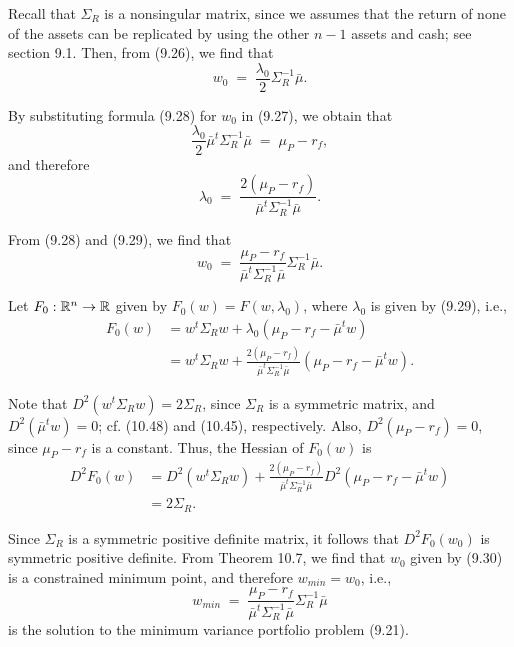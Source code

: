 
Recall that $\Sigma_R$ is a nonsingular matrix, since we assumes that the return of
none of the assets can be replicated by using the other $n-1$ assets and cash; see
section 9.1. Then, from (9.26), we find that
\begin{equation}
w_0 \;=\; \frac{\lambda_0}{2}\Sigma_R^{-1}\bar\mu.
\end{equation}

By substituting formula (9.28) for $w_0$ in (9.27), we obtain that
\[
\frac{\lambda_0}{2}\bar\mu^t\Sigma_R^{-1}\bar\mu \;=\; \mu_P-r_f,
\]
and therefore
\begin{equation}
\lambda_0 \;=\; \frac{2(\mu_P-r_f)}{\bar\mu^t\Sigma_R^{-1}\bar\mu}.
\end{equation}

From (9.28) and (9.29), we find that
\begin{equation}
w_0 \;=\; \frac{\mu_P-r_f}{\bar\mu^t\Sigma_R^{-1}\bar\mu}\Sigma_R^{-1}\bar\mu.
\end{equation}

Let $F_0 : \mathbb{R}^n \to \mathbb{R}$ given by $F_0(w) = F(w,\lambda_0)$, where $\lambda_0$ is given
by (9.29), i.e.,
\begin{align*}
F_0(w) &= w^t\Sigma_Rw + \lambda_0(\mu_P-r_f-\bar\mu^tw) \\
&= w^t\Sigma_Rw + \frac{2(\mu_P-r_f)}{\bar\mu^t\Sigma_R^{-1}\bar\mu}(\mu_P-r_f-\bar\mu^tw).
\end{align*}

Note that $D^2\left(w^t\Sigma_Rw\right) = 2\Sigma_R$, since $\Sigma_R$ is a symmetric
matrix, and $D^2(\bar\mu^tw) = 0$; cf. (10.48) and (10.45), respectively. Also,
$D^2(\mu_P-r_f) = 0$, since $\mu_P-r_f$ is a constant. Thus, the Hessian of $F_0(w)$ is
\begin{align*}
D^2F_0(w) &= D^2\left(w^t\Sigma_Rw\right) +
\frac{2(\mu_P-r_f)}{\bar\mu^t\Sigma_R^{-1}\bar\mu}D^2(\mu_P-r_f-\bar\mu^tw) \\
&= 2\Sigma_R.
\end{align*}

Since $\Sigma_R$ is a symmetric positive definite matrix, it follows that $D^2F_0(w_0)$
is symmetric positive definite. From Theorem 10.7, we find that $w_0$ given by (9.30)
is a constrained minimum point, and therefore $w_{min} = w_0$, i.e.,
\begin{equation}
w_{min} \;=\; \frac{\mu_P-r_f}{\bar\mu^t\Sigma_R^{-1}\bar\mu}\Sigma_R^{-1}\bar\mu
\end{equation}
is the solution to the minimum variance portfolio problem (9.21).

